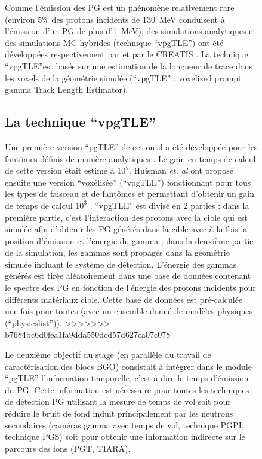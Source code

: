 \documentclass[11pt,a4paper,oldfontcommands]{memoir}
\begin{document}
\begin{figure}
Comme l'émission des PG est un phénomène relativement rare (environ 5\% des protons incidents de 130~MeV conduisent à l'émission d'un PG de plus d'1~MeV), des simulations analytiques et des simulations MC hybrides (technique \enquote{vpgTLE}) ont été développées respectivement par \cite{Sterpin_2015} et par le CREATIS \cite{Huisman_2016}. La technique \enquote{vpgTLE}est basée sur une estimation de la longueur de trace dans les voxels de la géométrie simulée (\enquote{vpgTLE} : voxelized prompt gamma Track Length Estimator).

\subsection{La technique \enquote{vpgTLE}}

Une première version \enquote{pgTLE} de cet outil a été développée pour les fantômes définis de manière analytiques \cite{El_Kanawati_2015}. Le gain en temps de calcul de cette version était estimé à $10^5$. Huisman \textit{et. al} ont proposé ensuite une version \enquote{voxélisée} (\enquote{vpgTLE}) fonctionnant pour tous les types de faisceau et de fantômes et permettant d'obtenir un gain de temps de calcul $10^3$ \cite{Huisman_2016}. \enquote{vpgTLE} est divisé en 2 parties : dans la première partie, c'est l'interaction des protons avec la cible qui est simulée afin d'obtenir les PG générés dans la cible avec à la fois la position d'émission et l'énergie du gamma  ; dans la deuxième partie de la simulation, les gammas sont propagés dans la géométrie simulée incluant le système de détection. L'énergie des gammas générés est tirée aléatoirement dans une base de données contenant le spectre des PG en fonction de l'énergie des protons incidents pour différents matériaux cible. Cette base de données est pré-calculée une fois pour toutes (avec un ensemble donné de modèles physiques (\enquote{physicslist})).
>>>>>>> b7684bc6d0fea1fa9dda550dcd57d627ca07c078

Le deuxième objectif du stage (en parallèle du travail de caractérisation des blocs BGO) consistait à intégrer dans le module \enquote{pgTLE} l'information temporelle, c'est-à-dire le temps d'émission du PG. Cette information est nécessaire pour toutes les techniques de détection PG utilisant la mesure de temps de vol soit pour réduire le bruit de fond induit principalement par les neutrons secondaires (caméras gamma avec temps de vol, technique PGPI, technique PGS) soit pour obtenir une information indirecte sur le parcours des ions (PGT, TIARA).



\end{figure}
\end{document}
